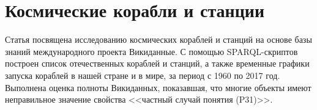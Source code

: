 \chapter{Космические корабли и станции}
\label{ch:spacecraft-space-station}

Статья посвящена исследованию космических кораблей и станций на основе базы знаний международного проекта Викиданные. С помощью SPARQL-скриптов построен список отечественных кораблей и станций, а также временные графики запуска кораблей в нашей стране и в мире, за период с 1960 по 2017 год. Выполнена оценка полноты Викиданных, показавшая, что многие объекты имеют неправильное значение свойства <<частный случай понятия (P31)>>.
